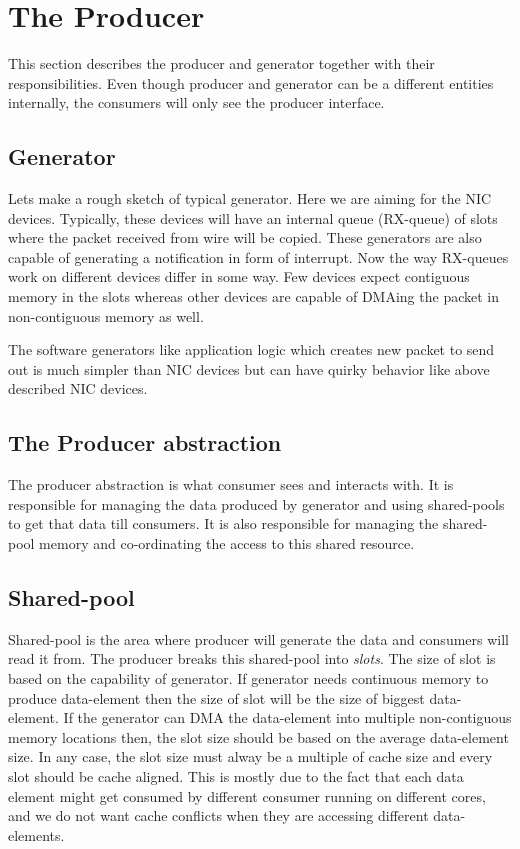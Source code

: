 \documentclass[a4paper,twoside]{report} %
\begin{document}
\section{The Producer}
This section describes the producer and generator together with
their responsibilities.  Even though producer and generator can
be a different entities internally, the consumers will only see
the producer interface.

\subsection{Generator}
Lets make a rough sketch of typical generator.  Here we are aiming
for the NIC devices.  Typically, these devices will have an
internal queue (RX-queue) of slots where the packet received
from wire will be copied.  These generators are also capable
of generating a notification in form of interrupt.  Now the
way RX-queues work on different devices differ in some way.
Few devices expect contiguous memory in the slots whereas
other devices are capable of DMAing the packet in non-contiguous
memory as well.

	
The software generators like application
logic which creates new packet to send out is much simpler than
NIC devices but can have quirky behavior like above described
NIC devices.


\subsection{The Producer abstraction}
The producer abstraction is what consumer sees and interacts with.
It is responsible for managing the data produced by generator and
using shared-pools to get that data till consumers.  It is also
responsible for managing the shared-pool memory and co-ordinating 
the access to this shared resource.


\subsection{Shared-pool}
Shared-pool is the area where producer will generate the data
and consumers will read it from. The producer breaks this
shared-pool into \textit{slots}.  The size of slot
is based on the capability of generator.  If generator needs
continuous memory to produce data-element then the size of
slot will be the size of biggest data-element.  If the
generator can DMA the data-element into multiple non-contiguous
memory locations then, the slot size should be based on
the average data-element size.  In any case, the slot size
must alway be a multiple of cache size and every slot should
be cache aligned.  This is mostly due to the fact that each
data element might get consumed by different consumer running
on different cores, and we do not want cache conflicts when
they are accessing different data-elements.
\end{document}
